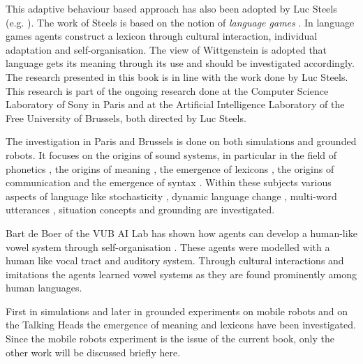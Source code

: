 

This adaptive behaviour based approach has also been adopted by Luc Steels (e.g. \citealt{steels:1996a,steels:1996b,steels:1997b}). The work of Steels is based on the notion of {\em language games} \citep{wittgenstein:1958}. In language games agents construct a lexicon through cultural interaction, individual adaptation and self-organisation. The view of Wittgenstein is adopted that language gets its meaning through its use and should be investigated accordingly. The research presented in this book is in line with the work done by Luc Steels. This research is part of the ongoing research done at the Computer Science Laboratory of Sony in Paris and at the Artificial Intelligence Laboratory of the Free University of Brussels, both directed by Luc Steels. 

The investigation in Paris and Brussels is done on both simulations and grounded robots. It focuses on the origins of sound systems, in particular in the field of phonetics \citep{deboer:1997,deboer:1999,oudeyer:1999}, the origins of meaning \citep{steels:1996b,steelsvogt:1997,dejongvogt:1998,vogt:1998a,dejong:1999}, the emergence of lexicons \citep{steels:1996a,steelskaplan:1998,kaplan:2000,vogt:1998b,vanlooveren:1999}, the origins of communication \citep{dejong:1999c,dejong:2000} and the emergence of syntax \citep{steels:2000a}. Within these subjects various aspects of language like stochasticity \citep{steelskaplan:1998,kaplan:2000}, dynamic language change \citep{steels:1997c,steelsmcintyre:1999,deboervogt:1999}, multi-word utterances \citep{vanlooveren:1999}, situation concepts \citep{dejong:99b} and grounding \citep{belpaeme:1998,steelsvogt:1997,steels:2000,kaplan:2000} are investigated.


Bart de Boer of the VUB AI Lab has shown how agents can develop a human-like vowel system through self-organisation \citep{deboer:1997,deboer:1999}. These agents were modelled with a human like vocal tract and auditory system. Through cultural interactions and imitations the agents learned vowel systems as they are found prominently among human languages. 


First in simulations \citep{steels:1996a,steels:1996b} and later in grounded experiments on mobile robots \citep{steelsvogt:1997,vogt:1998a,vogt:1998b,dejongvogt:1998} and on the Talking Heads \citep{belpaeme:1998,kaplan:2000,steels:2000} the emergence of meaning and lexicons have been investigated. Since the mobile robots experiment is the issue of the current book, only the other work will be discussed briefly here. 

